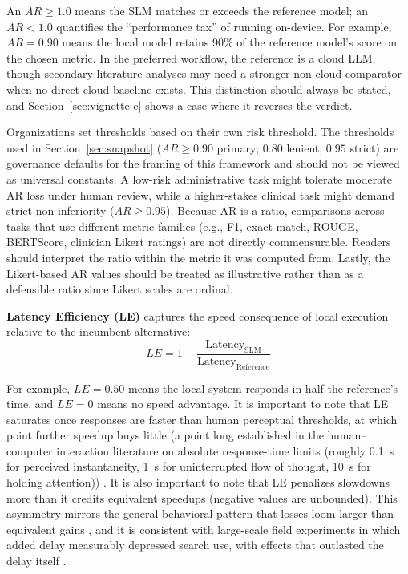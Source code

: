 \documentclass[11pt]{article}
\begin{document}
An $AR \geq 1.0$ means the SLM matches or exceeds the reference model; an $AR < 1.0$ quantifies the ``performance tax'' of running on-device. For example, $AR = 0.90$ means the local model retains 90\% of the reference model's score on the chosen metric. In the preferred workflow, the reference is a cloud LLM, though secondary literature analyses may need a stronger non-cloud comparator when no direct cloud baseline exists. This distinction should always be stated, and Section~\ref{sec:vignette-c} shows a case where it reverses the verdict.

Organizations set thresholds based on their own risk threshold. The thresholds used in Section~\ref{sec:snapshot} ($AR \geq 0.90$ primary; $0.80$ lenient; $0.95$ strict) are governance defaults for the framing of this framework and should not be viewed as universal constants. A low-risk administrative task might tolerate moderate AR loss under human review, while a higher-stakes clinical task might demand strict non-inferiority ($AR \geq 0.95$). Because AR is a ratio, comparisons across tasks that use different metric families (e.g., F1, exact match, ROUGE, BERTScore, clinician Likert ratings) are not directly commensurable. Readers should interpret the ratio within the metric it was computed from. Lastly, the Likert-based AR values should be treated as illustrative rather than as a defensible ratio since Likert scales are ordinal.

\textbf{Latency Efficiency (LE)} captures the speed consequence of local execution relative to the incumbent alternative:
\begin{equation}
  LE = 1 - \frac{\text{Latency}_{\text{SLM}}}{\text{Latency}_{\text{Reference}}}
  \label{eq:le}
\end{equation}

For example, $LE = 0.50$ means the local system responds in half the reference's time, and $LE = 0$ means no speed advantage. It is important to note that LE saturates once responses are faster than human perceptual thresholds, at which point further speedup buys little (a point long established in the human--computer interaction literature on absolute response-time limits (roughly 0.1~s for perceived instantaneity, 1~s for uninterrupted flow of thought, 10~s for holding attention)) \cite{Miller1968, Nielsen1993}. It is also important to note that LE penalizes slowdowns more than it credits equivalent speedups (negative values are unbounded). This asymmetry mirrors the general behavioral pattern that losses loom larger than equivalent gains \cite{Kahneman1979, Tversky1991}, and it is consistent with large-scale field experiments in which added delay measurably depressed search use, with effects that outlasted the delay itself \cite{Brutlag2009}.
\end{document}
